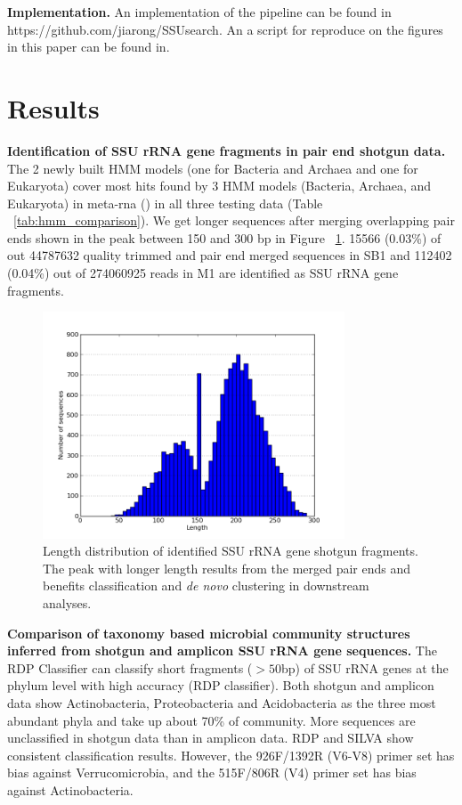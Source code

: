 \documentclass[12pt]{article}
\begin{document}
{\bf Implementation. } An implementation of the pipeline can be found
in https://github.com/jiarong/SSUsearch. An a script for reproduce on
the figures in this paper can be found in.

\section{Results}

{\bf Identification of SSU rRNA gene fragments in pair end shotgun
data. } The 2 newly built HMM models (one for Bacteria and Archaea and
one for Eukaryota) cover most hits found by 3 HMM models (Bacteria,
Archaea, and Eukaryota) in meta-rna (\cite{metarna}) in all three
testing data (Table ~\ref{tab:hmm_comparison}). We get longer
sequences after merging overlapping pair ends shown in the peak
between 150 and 300 bp in Figure ~\ref{fig:read_length_dist}. 15566
(0.03\%) of out 44787632 quality trimmed and pair end merged sequences
in SB1 and 112402 (0.04\%) out of 274060925 reads in M1 are identified
as SSU rRNA gene fragments.

    \begin{figure}[tbph!]
    \centering
    \includegraphics[width=0.8\textwidth]{figs/read_length_dist.png}
    \caption[Length distribution of identified SSU rRNA gene shotgun fragments]{Length distribution of identified SSU rRNA gene shotgun fragments. The peak with longer length results from the merged pair ends and benefits classification and {\em de novo} clustering in downstream analyses.}
    \label{fig:read_length_dist}
    \end{figure}

{\bf Comparison of taxonomy based microbial community structures
inferred from shotgun and amplicon SSU rRNA gene sequences. } The RDP
Classifier can classify short fragments ($>50$bp) of SSU rRNA genes at
the phylum level with high accuracy (RDP classifier). Both shotgun and
amplicon data show Actinobacteria, Proteobacteria and Acidobacteria as
the three most abundant phyla and take up about 70\% of
community. More sequences are unclassified in shotgun data than in
amplicon data. RDP and SILVA show consistent classification
results. However, the 926F/1392R (V6-V8) primer set has bias against
Verrucomicrobia, and the 515F/806R (V4) primer set has bias against
Actinobacteria.
\end{document}

